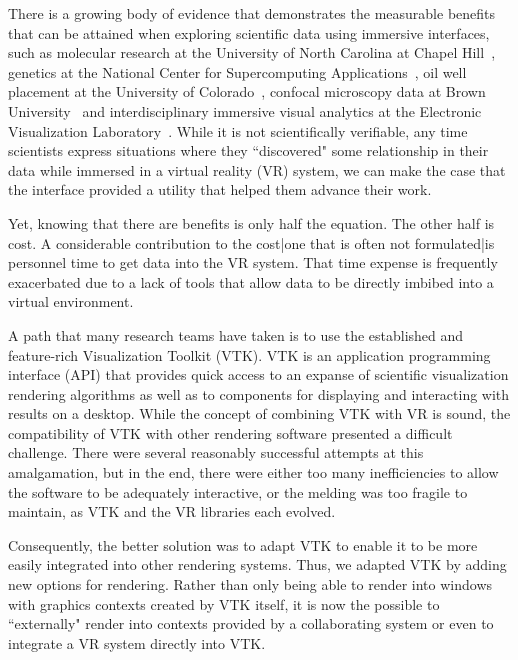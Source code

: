 There is a growing body of evidence that demonstrates the measurable benefits that can be
attained when exploring scientific data using immersive interfaces, such as
molecular research at the University of North Carolina at Chapel Hill~\cite{Brooks:1990},
genetics at the National Center for Supercomputing Applications~\cite{Brady:1995},
oil well placement at the University of Colorado~\cite{Gruchalla:2004},  confocal microscopy data at Brown University~\cite{Prabhat:2008} and interdisciplinary immersive visual analytics at the Electronic Visualization Laboratory~\cite{Marai:2016}.
While it is not scientifically verifiable, any time scientists
express situations where they ``discovered" some relationship in their data
while immersed in a virtual reality (VR) system, we can make the case that the
interface provided a utility that helped them advance their work.

Yet, knowing that there are benefits is only half the equation.
The other half is cost.
A considerable contribution to the cost|one that is often not
formulated|is personnel time to get data into the VR system.
That time expense is frequently exacerbated due to a lack of tools that
allow data to be directly imbibed into a virtual environment.

A path that many research teams have taken is to use the established and
feature-rich Visualization Toolkit (VTK).
VTK is an application programming interface (API) that provides quick access to an expanse
of scientific visualization rendering algorithms as well as to components
for displaying and interacting with results on a desktop.
While the concept of combining VTK with VR is sound, the
compatibility of VTK with other rendering software presented a difficult
challenge.  
There were several reasonably successful attempts at this amalgamation,
but in the end, there were either too many inefficiencies to allow the
software to be adequately interactive, or the melding was too fragile to
maintain, as VTK and the VR libraries each evolved.

Consequently, the better solution was to adapt VTK to enable it to be
more easily integrated into other rendering systems.
Thus, we adapted VTK by adding new options for rendering.
Rather than only being able to render into windows with graphics contexts
created by VTK itself, it is now the possible to ``externally" render
into contexts provided by a collaborating system or even to integrate a
VR system directly into VTK.

